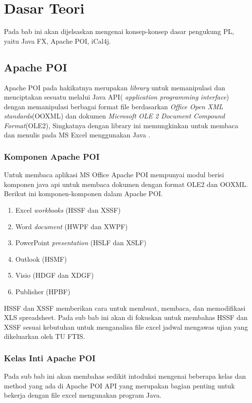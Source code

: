 \chapter{Dasar Teori}
\label{chap:definition}
Pada bab ini akan dijelsaskan mengenai konsep-konsep dasar pengukung PL, yaitu Java FX, Apache POI, iCal4j.

\section{Apache POI}

Apache POI pada hakikatnya merupakan \textit{library} untuk memanipulasi dan menciptakan sesuatu melalui Java API( \textit{application programming interface}) dengan memanipulasi berbagai format file berdasarkan \textit{Office Open XML standards}(OOXML) dan dokumen \textit{Microsoft OLE 2 Document Compound Format}(OLE2), Singkatnya dengan library ini memungkinkan untuk membaca dan menulis pada MS Excel menggunakan Java \cite{apachepoi}. \\


\subsection{Komponen Apache POI}
Untuk membaca aplikasi MS Office Apache POI mempunyai modul berisi komponen java api untuk membaca dokumen dengan format OLE2 dan OOXML. Berikut ini komponen-komponen dalam Apache POI.\cite{apachepoi}  

\begin{enumerate}
	\item Excel \textit{workbooks} (HSSF dan XSSF)
	\item Word \textit{document} (HWPF dan XWPF)
	\item PowerPoint \textit{presentation} (HSLF dan XSLF)
	\item Outlook (HSMF)
	\item Visio (HDGF dan XDGF)
	\item Publisher (HPBF)
\end{enumerate}

HSSF dan XSSF memberikan cara untuk membuat, membaca, dan memodifikasi XLS spreadsheet. Pada sub bab ini akan di fokuskan untuk membahas HSSF dan XSSF sesuai kebutuhan untuk menganalisa file excel jadwal mengawas ujian yang dikeluarkan oleh TU FTIS.\cite{apachepoi}


\subsection{Kelas Inti Apache POI} 
Pada sub bab ini akan membahas sedikit intoduksi mengenai beberapa kelas dan method yang ada di Apache POI API yang merupakan bagian penting untuk bekerja dengan file excel mengunakan program Java.\cite{apachepoi2}

